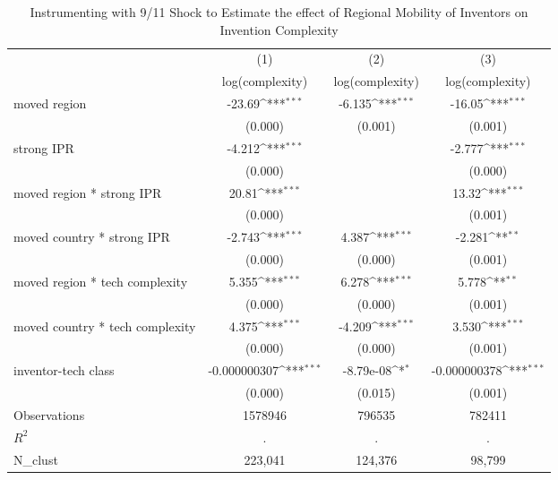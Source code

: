 {
\def\sym#1{\ifmmode^{#1}\else\(^{#1}\)\fi}
\begin{longtable}{l*{3}{c}}
\caption{Instrumenting with 9/11 Shock to Estimate the effect of Regional Mobility of Inventors on Invention Complexity \label{model8a8b8c}}\\
\hline\hline\endfirsthead\hline\endhead\hline\endfoot\endlastfoot
                &\multicolumn{1}{c}{(1)}&\multicolumn{1}{c}{(2)}&\multicolumn{1}{c}{(3)}\\
                &\multicolumn{1}{c}{log(complexity)}&\multicolumn{1}{c}{log(complexity)}&\multicolumn{1}{c}{log(complexity)}\\
\hline
moved region    &   -23.69\sym{***}&   -6.135\sym{***}&   -16.05\sym{***}\\
                &  (0.000)         &  (0.001)         &  (0.001)         \\
strong IPR      &   -4.212\sym{***}&                  &   -2.777\sym{***}\\
                &  (0.000)         &                  &  (0.000)         \\
moved region * strong IPR&    20.81\sym{***}&                  &    13.32\sym{***}\\
                &  (0.000)         &                  &  (0.001)         \\
moved country * strong IPR&   -2.743\sym{***}&    4.387\sym{***}&   -2.281\sym{**} \\
                &  (0.000)         &  (0.000)         &  (0.001)         \\
moved region * tech complexity&    5.355\sym{***}&    6.278\sym{***}&    5.778\sym{**} \\
                &  (0.000)         &  (0.000)         &  (0.001)         \\
moved country * tech complexity&    4.375\sym{***}&   -4.209\sym{***}&    3.530\sym{***}\\
                &  (0.000)         &  (0.000)         &  (0.001)         \\
inventor-tech class&-0.000000307\sym{***}&-8.79e-08\sym{*}  &-0.000000378\sym{***}\\
                &  (0.000)         &  (0.015)         &  (0.001)         \\
\hline
Observations    &  1578946         &   796535         &   782411         \\
$R^2$              &        .         &        .         &        .         \\
N\_clust         &  223,041         &  124,376         &   98,799         \\

\end{longtable}}
